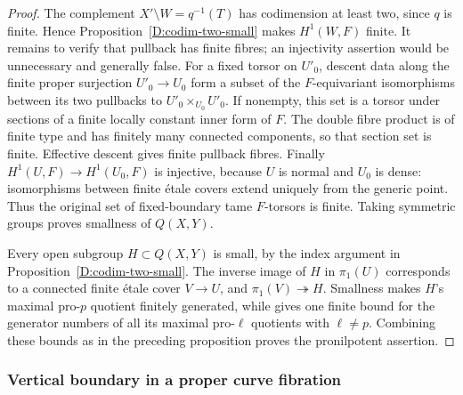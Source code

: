 \begin{proof}
The complement $X'\setminus W=q^{-1}(T)$ has codimension
at least two, since $q$ is finite. Hence
Proposition~\ref{D:codim-two-small} makes $H^1(W,F)$ finite.
It remains to verify that pullback has finite fibres; an
injectivity assertion would be unnecessary and generally false.
For a fixed torsor on $U'_0$, descent data along the finite
proper surjection $U'_0\to U_0$ form a subset of the
$F$-equivariant isomorphisms between its two pullbacks to
$U'_0\times_{U_0}U'_0$. If nonempty, this set is a torsor
under sections of a finite locally constant inner form of
$F$. The double fibre product is of finite type and has
finitely many connected components, so that section set is
finite. Effective descent
\cite[Theorem 5.19(ii)]{Rydh2010} gives finite pullback fibres.
Finally $H^1(U,F)\to H^1(U_0,F)$ is injective, because
$U$ is normal and $U_0$ is dense: isomorphisms between
finite \'etale covers extend uniquely from the generic
point. Thus the original set of fixed-boundary tame
$F$-torsors is finite. Taking symmetric groups proves
smallness of $Q(X,Y)$.

Every open subgroup $H\subset Q(X,Y)$ is small, by the
index argument in Proposition~\ref{D:codim-two-small}.
The inverse image of $H$ in $\pi_1(U)$ corresponds to a
connected finite \'etale cover $V\to U$, and
$\pi_1(V)\twoheadrightarrow H$. Smallness makes
$H$'s maximal pro-$p$ quotient finitely generated, while
\cite[Theorem 4.11]{Orgogozo2003} gives one finite bound
for the generator numbers of all its maximal pro-$\ell$
quotients with $\ell\ne p$. Combining these bounds as
in the preceding proposition proves the pronilpotent assertion.
\end{proof}

\subsubsection{Vertical boundary in a proper curve fibration}

